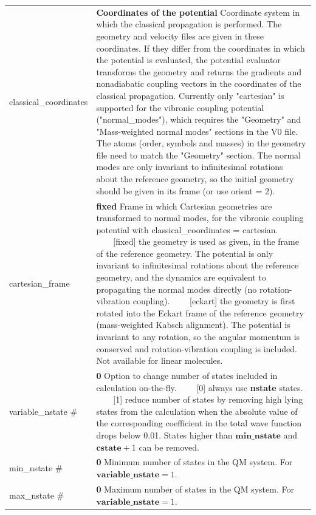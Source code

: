 \documentclass{report}
\newcommand{\tabitem}{~~\llap{--}~~}
\begin{document}
\begin{tabularx}{\textwidth}{ m{2.5cm} X }
classical\_coordinates		&
    \textbf{Coordinates of the potential} \newline
    Coordinate system in which the classical propagation is performed. The geometry and velocity files are given in these coordinates. If they differ from the coordinates in which the potential is evaluated, the potential evaluator transforms the geometry and returns the gradients and nonadiabatic coupling vectors in the coordinates of the classical propagation. Currently only "cartesian" is supported for the vibronic coupling potential ("normal\_modes"), which requires the "Geometry" and "Mass-weighted normal modes" sections in the V0 file. The atoms (order, symbols and masses) in the geometry file need to match the "Geometry" section. The normal modes are only invariant to infinitesimal rotations about the reference geometry, so the initial geometry should be given in its frame (or use orient = 2). \\

cartesian\_frame		&
    \textbf{fixed} \newline
    Frame in which Cartesian geometries are transformed to normal modes, for the vibronic coupling potential with classical\_coordinates = cartesian. \newline
    \tabitem [fixed] the geometry is used as given, in the frame of the reference geometry. The potential is only invariant to infinitesimal rotations about the reference geometry, and the dynamics are equivalent to propagating the normal modes directly (no rotation-vibration coupling). \newline
    \tabitem [eckart] the geometry is first rotated into the Eckart frame of the reference geometry (mass-weighted Kabsch alignment). The potential is invariant to any rotation, so the angular momentum is conserved and rotation-vibration coupling is included. Not available for linear molecules. \\

variable\_nstate \#		&
    \textbf{0} \newline
    Option to change number of states included in calculation on-the-fly. \newline
    \tabitem [0] always use \textbf{nstate} states. \newline
    \tabitem [1] reduce number of states by removing high lying states from the calculation when the absolute value of the corresponding coefficient in the total wave function drops below 0.01. States higher than $\textbf{min\_nstate}$ and $\textbf{cstate}+1$ can be removed. \\

min\_nstate \#		&
    \textbf{0} \newline
    Minimum number of states in the QM system. For $\textbf{variable\_nstate}=1$. \\

max\_nstate \#		&
    \textbf{0} \newline
    Maximum number of states in the QM system. For $\textbf{variable\_nstate}=1$.  \\

\end{tabularx}
\end{document}
